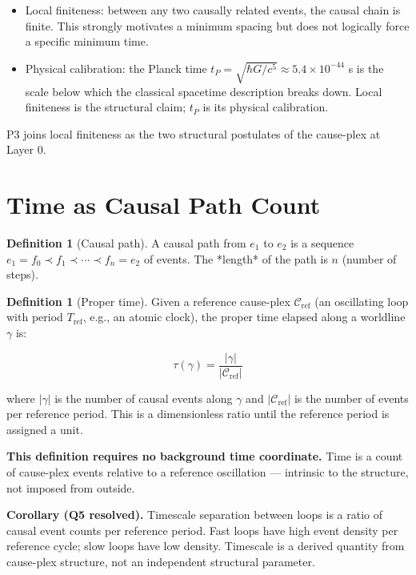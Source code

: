 \documentclass[11pt]{article}
\providecommand{\tightlist}{\setlength{\itemsep}{0pt}\setlength{\parskip}{0pt}}
\theoremstyle{definition}
\newtheorem{definition}[theorem]{Definition}
\theoremstyle{remark}
\begin{document}
\begin{itemize}
\tightlist
\item
  Local finiteness: between any two causally related events, the causal
  chain is finite. This strongly motivates a minimum spacing but does
  not logically force a specific minimum time.
\item
  Physical calibration: the Planck time
  \(t_P = \sqrt{\hbar G / c^5} \approx 5.4 \times 10^{-44}\) s is the
  scale below which the classical spacetime description breaks down.
  Local finiteness is the structural claim; \(t_P\) is its physical
  calibration.
\end{itemize}

P3 joins local finiteness as the two structural postulates of the
cause-plex at Layer 0.

\medskip

\section{Time as Causal Path Count}\label{time-as-causal-path-count}

\begin{definition}[Causal path]
\label{definition:3-1}
A causal path from $e_1$ to $e_2$ is a sequence $e_1 = f_0 \prec f_1 \prec \cdots \prec f_n = e_2$ of events. The *length* of the path is $n$ (number of steps).

\end{definition}

\begin{definition}[Proper time]
\label{definition:3-2}
Given a reference cause-plex $\mathcal{C}_{\text{ref}}$ (an oscillating loop with period $T_{\text{ref}}$, e.g., an atomic clock), the proper time elapsed along a worldline $\gamma$ is:
\end{definition}

\[\tau(\gamma) = \frac{|\gamma|}{|\mathcal{C}_{\text{ref}}|}\]

where \(|\gamma|\) is the number of causal events along \(\gamma\) and
\(|\mathcal{C}_{\text{ref}}|\) is the number of events per reference
period. This is a dimensionless ratio until the reference period is
assigned a unit.

\textbf{This definition requires no background time coordinate.} Time is
a count of cause-plex events relative to a reference oscillation ---
intrinsic to the structure, not imposed from outside.

\textbf{Corollary (Q5 resolved).} Timescale separation between loops is
a ratio of causal event counts per reference period. Fast loops have
high event density per reference cycle; slow loops have low density.
Timescale is a derived quantity from cause-plex structure, not an
independent structural parameter.
\end{document}
